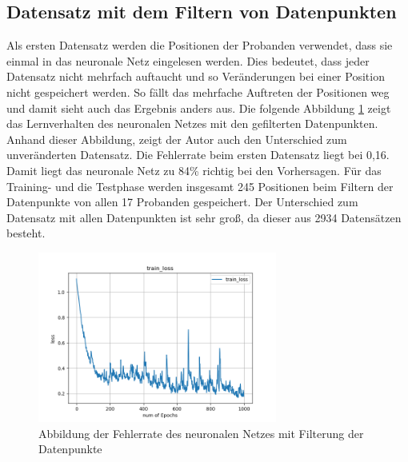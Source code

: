 \subsection{Datensatz mit dem Filtern von Datenpunkten}
Als ersten Datensatz werden die Positionen der Probanden verwendet, dass sie einmal in das neuronale Netz eingelesen werden. Dies bedeutet, dass jeder Datensatz nicht mehrfach auftaucht und so Veränderungen bei einer Position nicht gespeichert werden. So fällt das mehrfache Auftreten der Positionen weg und damit sieht auch das Ergebnis anders aus. Die folgende Abbildung \ref{fig:wo_streu} zeigt das Lernverhalten des neuronalen Netzes mit den gefilterten Datenpunkten. Anhand dieser Abbildung, zeigt der Autor auch den Unterschied zum unveränderten Datensatz. 
\newpage
Die Fehlerrate beim ersten Datensatz liegt bei 0,16. Damit liegt das neuronale Netz zu 84\% richtig bei den Vorhersagen. Für das Training- und die Testphase werden insgesamt 245 Positionen beim Filtern der Datenpunkte von allen 17 Probanden gespeichert. Der Unterschied zum Datensatz mit allen Datenpunkten ist sehr groß, da dieser aus 2934 Datensätzen besteht.

\begin{figure}[H]
	\centering
		\includegraphics[width=0.7\textwidth]{images/wo_streu.png}
	\caption{Abbildung der Fehlerrate des neuronalen Netzes mit Filterung der Datenpunkte}	\label{fig:wo_streu}
\end{figure}


